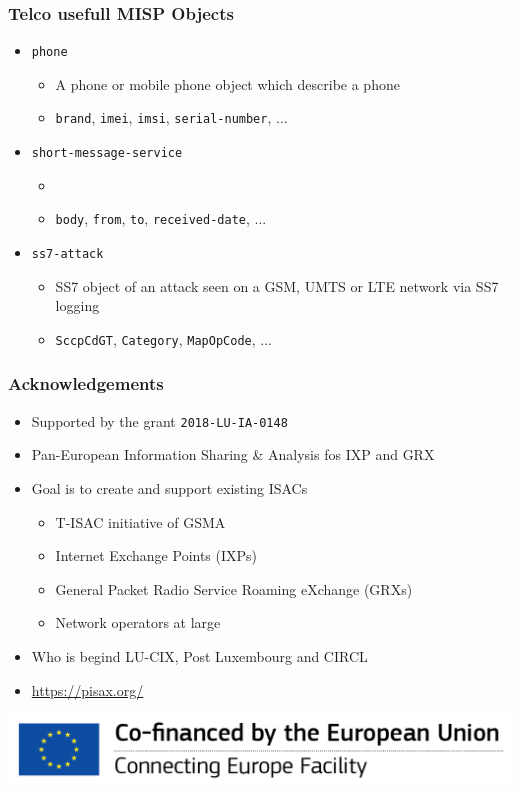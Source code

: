 \begin{frame}
    \frametitle{Telco usefull {\bf MISP Objects}}
    \begin{itemize}
        \item \texttt{phone}
        \begin{itemize}
            \item A phone or mobile phone object which describe a phone
            \item \texttt{brand}, \texttt{imei}, \texttt{imsi}, \texttt{serial-number}, ...
        \end{itemize}

        \item \texttt{short-message-service}
        \begin{itemize}
            \item 
            \item \texttt{body}, \texttt{from}, \texttt{to}, \texttt{received-date}, ...
        \end{itemize}

        \item \texttt{ss7-attack}
        \begin{itemize}
            \item SS7 object of an attack seen on a GSM, UMTS or LTE network via SS7 logging
            \item \texttt{SccpCdGT}, \texttt{Category}, \texttt{MapOpCode}, ...
        \end{itemize}
    \end{itemize}
\end{frame}

\begin{frame}
    \frametitle{Acknowledgements}
    \begin{itemize}
        \item Supported by the grant \texttt{2018-LU-IA-0148}
        \item Pan-European Information Sharing \& Analysis fos IXP and GRX
        \item Goal is to create and support existing ISACs
        \begin{itemize}
            \item T-ISAC initiative of GSMA
            \item Internet Exchange Points (IXPs)
            \item General Packet Radio Service Roaming eXchange (GRXs)
            \item Network operators at large
        \end{itemize}
        \item Who is begind LU-CIX, Post Luxembourg and CIRCL
        \item \url{https://pisax.org/}
    \end{itemize}
    \begin{center}
        \includegraphics[scale=0.5]{en_cef.png}
    \end{center}
\end{frame}


